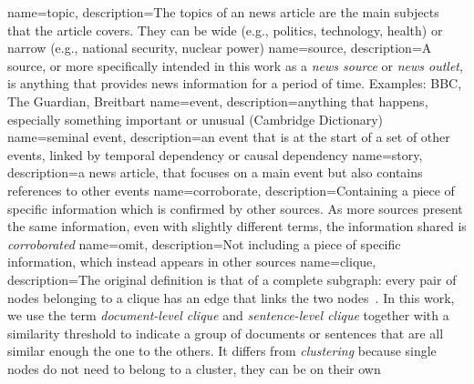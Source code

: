 {
    name=topic,
    description={The topics of an news article are the main subjects that the article covers. They can be wide (e.g., politics, technology, health) or narrow (e.g., national security, nuclear power)}
}
{
    name=source,
    description={A source, or more specifically intended in this work as a \emph{news source} or \emph{news outlet}, is anything that provides news information for a period of time. Examples: BBC, The Guardian, Breitbart}
}
{
    name=event,
    description={anything that happens, especially something important or unusual (Cambridge Dictionary)}
}
{
    name=seminal event,
    description={an event that is at the start of a set of other events, linked by temporal dependency or causal dependency}
}
{
    name=story,
    description={a news article, that focuses on a main event but also contains references to other events}
}
{
    name=corroborate,
    description={Containing a piece of specific information which is confirmed by other sources. As more sources present the same information, even with slightly different terms, the information shared is \emph{corroborated}}
}
{
    name=omit,
    description={Not including a piece of specific information, which instead appears in other sources}
}
{
    name=clique,
    description={The original definition is that of a complete subgraph: every pair of nodes belonging to a clique has an edge that links the two nodes~\citep{luce1949method}. In this work, we use the term \emph{document-level clique} and \emph{sentence-level clique} together with a similarity threshold to indicate a group of documents or sentences that are all similar enough the one to the others. It differs from \emph{clustering} because single nodes do not need to belong to a cluster, they can be on their own}
}
